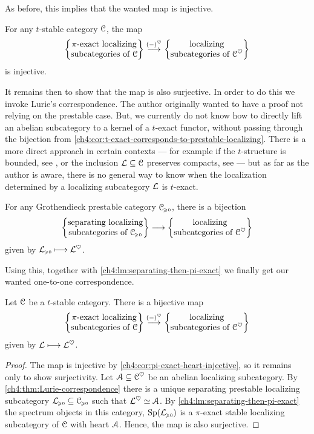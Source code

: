 As before, this implies that the wanted map is injective. 

\begin{corollary}
    \label{ch4:cor:pi-exact-heart-injective}
    For any $t$-stable category $\C$, the map
    \[\piexact \overset{(-)^\heart}\to \ablocalizing\]
    is injective. 
\end{corollary}

It remains then to show that the map is also surjective. In order to do this we invoke Lurie's correspondence. The author originally wanted to have a proof not relying on the prestable case. But, we currently do not know how to directly lift an abelian subcategory to a kernel of a $t$-exact functor, without passing through the bijection from \cref{ch4:cor:t-exact-corresponds-to-prestable-localizing}. There is a more direct approach in certain contexts --- for example if the $t$-structure is bounded, see \cite[2.20]{antieau-gepner-heller_2019}, or the inclusion $\L\subseteq \C$ preserves compacts, see \cite[2.7]{hennion-porta-vezzosi_2016} --- but as far as the author is aware, there is no general way to know when the localization determined by a localizing subcategory $\L$ is $t$-exact. 

\begin{theorem}
    \label{ch4:thm:Lurie-correspondence}
    For any Grothendieck prestable category $\C\geqz$, there is a bijection 
    \[\separating \to \ablocalizing\]
    given by $\L\geqz\longmapsto \L^\heart$. 
\end{theorem}

Using this, together with \cref{ch4:lm:separating-then-pi-exact} we finally get our wanted one-to-one correspondence. 

\begin{theorem}
    \label{ch4:thm:main}
    Let $\C$ be a $t$-stable category. There is a bijective map
    \[\piexact\overset{(-)^\heart}\to \ablocalizing\]
    given by $\L\longmapsto \L^\heart$. 
\end{theorem}
\begin{proof}
    The map is injective by \cref{ch4:cor:pi-exact-heart-injective}, so it remains only to show surjectivity. Let $\A\subseteq \C^\heart$ be an abelian localizing subcategory. By \cref{ch4:thm:Lurie-correspondence} there is a unique separating prestable localizing subcategory $\L\geqz \subseteq \C\geqz$ such that $\L^\heart \simeq \A$. By \cref{ch4:lm:separating-then-pi-exact} the spectrum objects in this category, $\Sp(\L\geqz)$ is a $\pi$-exact stable localizing subcategory of $\C$ with heart $\A$. Hence, the map is also surjective. 
\end{proof}


